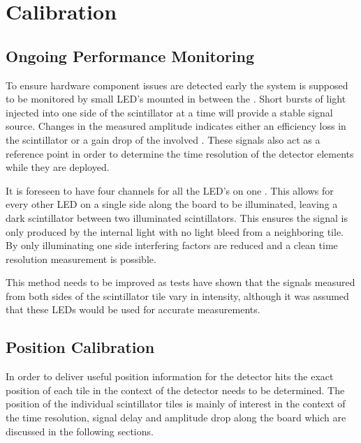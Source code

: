 \documentclass[../BTOF_summary.tex]{subfiles}
\begin{document}
\section{Calibration}

\subsection{Ongoing Performance Monitoring}

To ensure hardware component issues are detected early the system is supposed to be monitored by small LED's mounted in between the \sipms .
Short bursts of light injected into one side of the scintillator at a time will provide a stable signal source.
Changes in the measured amplitude indicates either an efficiency loss in the scintillator or a gain drop of the involved \sipms .
These signals also act as a reference point in order to determine the time resolution of the detector elements while they are deployed.

It is foreseen to have four channels for all the LED's on one \railboard .
This allows for every other LED on a single side along the board to be illuminated, leaving a dark scintillator between two illuminated scintillators.
This ensures the signal is only produced by the internal light with no light bleed from a neighboring tile.
By only illuminating one side interfering factors are reduced and a clean time resolution measurement is possible.

This method needs to be improved as tests have shown that the signals measured from both sides of the scintillator tile vary in intensity, although it was assumed that these LEDs would be used for accurate measurements.


\subsection{Position Calibration}

In order to deliver useful position information for the detector hits the exact position of each tile in the context of the detector needs to be determined.%
The position of the individual scintillator tiles is mainly of interest in the context of the time resolution, signal delay and amplitude drop along the board which are discussed in the following sections.
\end{document}
